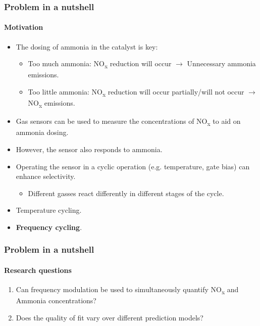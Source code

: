 \documentclass{beamer}
\newcommand{\nox}{\texorpdfstring{NO\textsubscript{x}}{NOx}\xspace}
\begin{document}
\begin{frame}
	\frametitle{Problem in a nutshell}
	\framesubtitle{Motivation}
	
	\begin{itemize}
		\item The dosing of ammonia in the catalyst is key:
		
		\begin{itemize}
			\item Too much ammonia: \nox  reduction will occur $\rightarrow$ Unnecessary ammonia emissions.
			
			\item Too little ammonia: \nox  reduction will occur partially/will not occur $\rightarrow$ \nox  emissions.
			
		\end{itemize}
		\item Gas sensors can be used to measure the concentrations of \nox  to aid on ammonia dosing.
		
		\item However, the sensor also responds to ammonia.
		
		\item Operating the sensor in a cyclic operation (e.g. temperature, gate bias) can enhance selectivity.
		
		\begin{itemize}
			\item Different gasses react differently in different stages of the cycle.
			
		\end{itemize}
		\item Temperature cycling.
		
		\item \textbf{Frequency cycling}.
	\end{itemize}
	
\end{frame}


\begin{frame}
	\frametitle{Problem in a nutshell}
	\framesubtitle{Research questions}
	
	
\begin{enumerate}
	\item Can frequency modulation be used to simultaneously quantify \nox and Ammonia concentrations?
	
	\item Does the quality of fit vary over different prediction models?
\end{enumerate}
	
\end{frame}
\end{document}
